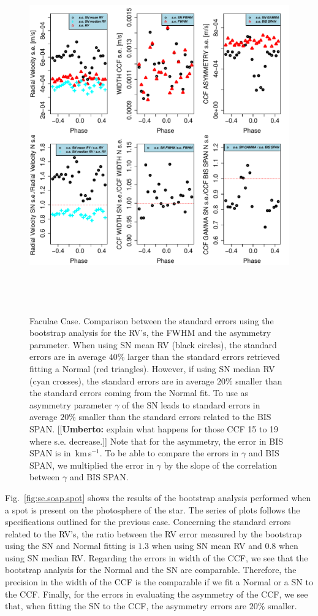 \documentclass{aa}
\def\kms{\hbox{\,km\,s$^{-1}$}}       %
\newcommand{\umberto}[1]{{\color{green}[[\textbf{Umberto: }#1]]}}
\begin{document}
\begin{figure}[htbp]
   \centering
\includegraphics[height = 6in]{RV_comparison_FACULAE_standard_errors.pdf} 
   \caption{Faculae Case. Comparison between the standard errors using the bootstrap analysis for the RV's, the FWHM and the asymmetry parameter. When using SN mean RV (black circles), the standard errors are in average $40\%$ larger than the standard errors retrieved fitting a Normal (red triangles). However, if using SN median RV (cyan crosses), the standard errors are in average $20\%$ smaller than the standard errors coming from the Normal fit. To use as asymmetry parameter $\gamma$ of the SN leads to standard errors in average $20\%$ smaller than the standard errors related to the BIS SPAN. \umberto{explain what happens for those CCF 15 to 19 where s.e. decrease.} Note that for the asymmetry, the error in BIS SPAN is in \kms. To be able to compare the errors in $\gamma$ and BIS SPAN, we multiplied the error in $\gamma$ by the slope of the correlation between $\gamma$ and BIS SPAN.}
   \label{fig:se.soap.faculae}
\end{figure}

Fig.~\ref{fig:se.soap.spot} shows the results of the bootstrap analysis performed when a spot is present on the photosphere of the star. The series of plots follows the specifications outlined for the previous case. Concerning the standard errors related to the RV's, the ratio between the RV error measured by the bootstrap using the SN and Normal fitting is $1.3$ when using SN mean RV and $0.8$ when using SN median RV. Regarding the errors in width of the CCF, we see that the bootstrap analysis for the Normal and the SN are comparable. Therefore, the precision in the width of the CCF is the comparable if we fit a Normal or a SN to the CCF. Finally, for the errors in evaluating the asymmetry of the CCF, we see that, when fitting the SN to the CCF, the asymmetry errors are $20\%$ smaller.
\end{document}
